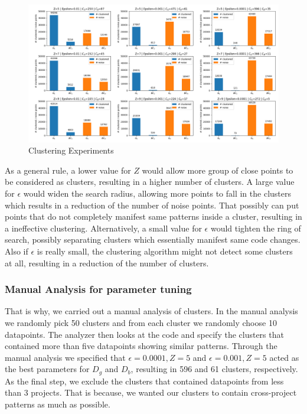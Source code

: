 \begin{figure}[h]
\centering
\includegraphics[width=1\textwidth]{figs/clusters.png}
\caption{\label{fig:clustering} Clustering Experiments}
\end{figure}

As a general rule, a lower value for $Z$ would allow more group of close points to be considered as clusters, resulting in a higher number of clusters. A large value for $\epsilon$ would widen the search radius, allowing more points to fall in the clusters which results in a reduction of the number of noise points. That possibly can put points that do not completely manifest same patterns inside a cluster, resulting in a ineffective clustering. Alternatively, a small value for $\epsilon$ would tighten the ring of search, possibly separating clusters which essentially manifest same code changes. Also if $\epsilon$ is really small, the clustering algorithm might not detect some clusters at all, resulting in a reduction of the number of clusters. 

\subsubsection{\label{sec:manual_analysis_parameter_tuning}Manual Analysis for parameter tuning}

That is why, we carried out a manual analysis of clusters. In the manual analysis we randomly pick 50 clusters and from each cluster we randomly choose 10 datapoints. The analyzer then looks at the code and specify the clusters that contained more than five datapoints showing similar patterns. Through the manual analysis we specified that $\epsilon=0.0001, Z=5$ and $\epsilon=0.001, Z=5$ acted as the best parameters for $D_g$ and $D_b$, resulting in 596 and 61 clusters, respectively. As the final step, we exclude the clusters that contained datapoints from less than 3 projects. That is because, we wanted our clusters to contain cross-project patterns as much as possible.  

